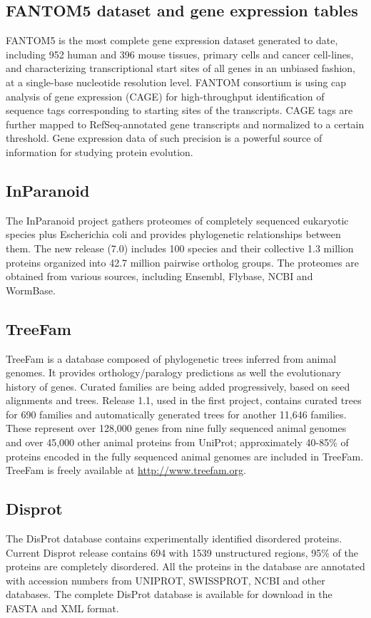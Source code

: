 \documentclass[11pt, a4paper,oneside]{report}
\begin{document}
\subsection{FANTOM5 dataset and gene expression tables}
FANTOM5 is the most complete gene expression dataset generated to date, including 952 human and 396 mouse tissues, primary cells and cancer cell-lines, and characterizing transcriptional start sites of all genes in an unbiased fashion, at a single-base nucleotide resolution level. FANTOM consortium is using cap analysis of gene expression (CAGE) for high-throughput identification of sequence tags corresponding to starting sites of the transcripts\cite{Shiraki2003}. CAGE tags are further mapped to RefSeq-annotated gene transcripts and normalized to a certain threshold\cite{Balwierz2009}. Gene expression data of such precision is a powerful source of information for studying protein evolution. 

\subsection{InParanoid}
The InParanoid project gathers proteomes of completely sequenced eukaryotic species plus Escherichia coli and provides phylogenetic relationships between them. The new release (7.0) includes 100 species and their collective 1.3 million proteins organized into 42.7 million pairwise ortholog groups\cite{Ostlund2010}. The proteomes are obtained from various sources, including Ensembl, Flybase, NCBI and WormBase. 
\subsection{TreeFam}
TreeFam is a database composed of phylogenetic trees inferred from animal genomes. It provides orthology/paralogy predictions as well the evolutionary history of genes. Curated families are being added progressively, based on seed alignments and trees. Release 1.1, used in the first project, contains curated trees for 690 families and automatically generated trees for another 11,646 families\cite{Li2006}. These represent over 128,000 genes from nine fully sequenced animal genomes and over 45,000 other animal proteins from UniProt; approximately 40-85\% of proteins encoded in the fully sequenced animal genomes are included in TreeFam. TreeFam is freely available at \url{http://www.treefam.org}.
\subsection{Disprot}
The DisProt database contains experimentally identified disordered proteins\cite{Sickmeier2007}. Current Disprot release contains 694 with 1539 unstructured regions, 95\% of the proteins are completely disordered. All the proteins in the database are annotated with accession numbers from UNIPROT, SWISSPROT, NCBI and other databases. The complete DisProt database is available for download in the FASTA and XML format.
\end{document}
